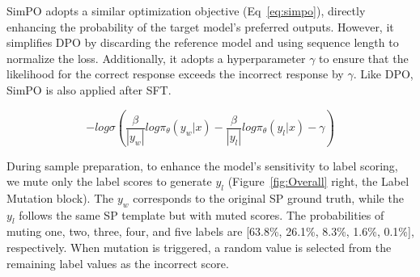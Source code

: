 \documentclass[11pt]{article}
\begin{document}

SimPO adopts a similar optimization objective (Eq~\ref{eq:simpo}), directly enhancing the probability of the target model’s preferred outputs. However, it simplifies DPO by discarding the reference model and using sequence length to normalize the loss. Additionally, it adopts a hyperparameter $\gamma$ to ensure that the likelihood for the correct response exceeds the incorrect response by $\gamma$. Like DPO, SimPO is also applied after SFT.

\begin{equation}
\label{eq:simpo}
-log\sigma (\frac{\beta}{|y_w|}log\pi_{\theta} (y_w|x) - \frac{\beta}{|y_l|}log\pi_{\theta} (y_l|x) - \gamma)
\end{equation}

 
 During sample preparation, to enhance the model's sensitivity to label scoring, we mute only the label scores to generate $y_l$ (Figure~\ref{fig:Overall} right, the Label Mutation block). The $y_w$ corresponds to the original SP ground truth, while the $y_l$ follows the same SP template but with muted scores. The probabilities of muting one, two, three, four, and five labels are [63.8\%, 26.1\%, 8.3\%, 1.6\%, 0.1\%], respectively. When mutation is triggered, a random value is selected from the remaining label values as the incorrect score.
 
\end{document}
